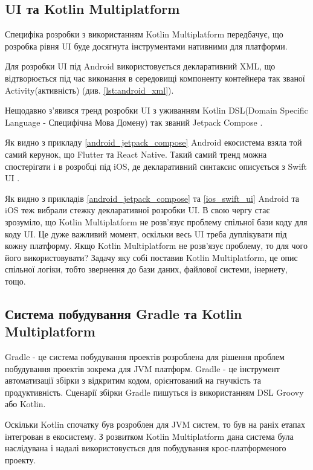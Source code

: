\subsection{UI та Kotlin Multiplatform}
\label{subsec:kmm_ui}
Специфіка розробки з використанням Kotlin Multiplatform передбачує, що розробка рівня UI буде досягнута
інструментами нативними для платформи.

Для розробки UI під Android використовується декларативний XML, що відтворюється під час виконання в середовищі компоненту
контейнера так званої Activity(активність) (див. \ref{lst:android_xml}).

Нещодавно з'явився тренд розробки UI з уживанням
Kotlin DSL(Domain Specific Language - Специфічна Мова Домену) так званий Jetpack Compose \cite{jetpack_compose}.

Як видно з прикладу \ref{android_jetpack_compose} Android екосистема взяла той самий керунок, що Flutter та React Native.
Такий самий тренд можна спостерігати і в розробці під iOS, де декларативний синтаксис описується з Swift UI \cite{swift_ui}.

Як видно з прикладів \ref{android_jetpack_compose} та \ref{ios_swift_ui} Android та iOS теж вибрали стежку декларативної розробки UI.
В свою чергу стає зрозуміло, що Kotlin Multiplatform не розв'язує проблему спільної бази коду для коду UI.
Це дуже важливий момент, оскільки весь UI треба дуплікувати під кожну платформу.
Якщо Kotlin Multiplatform не розв'язує проблему, то для чого його використовувати?
Задачу яку собі поставив Kotlin Multiplatform, це опис спільної логіки, тобто звернення до бази даних, файлової системи, інернету, тощо.

\subsection{Система побудування Gradle та Kotlin Multiplatform}
\label{subsec:kmm_gradle}

Gradle - це система побудування проектів розроблена для рішення проблем побудування проектів зокрема для JVM платформ.
Gradle - це інструмент автоматизації збірки з відкритим кодом, орієнтований на гнучкість та продуктивність. \cite{gradle_user_manual}
Сценарії збірки Gradle пишуться із використанням DSL Groovy або Kotlin. \cite{gradle_user_manual}

Оскільки Kotlin спочатку був розроблен для JVM систем, то був на раніх етапах інтегрован в екосистему.
З розвитком Kotlin Multiplatform дана система була наслідувана і надалі використовується для побудування крос-платформеного проекту.

